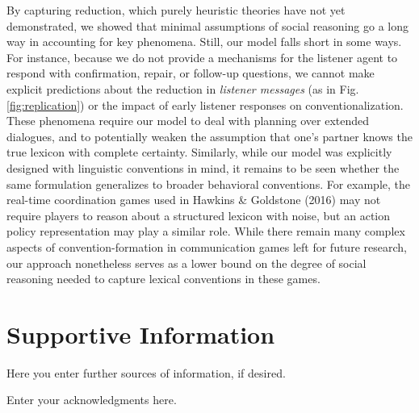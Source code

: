 \documentclass[manuscript]{stjour}
\begin{document}
By capturing reduction, which purely heuristic theories have not yet
demonstrated, we showed that minimal assumptions of social reasoning go
a long way in accounting for key phenomena. Still, our model falls short
in some ways. For instance, because we do not provide a mechanisms for
the listener agent to respond with confirmation, repair, or follow-up
questions, we cannot make explicit predictions about the reduction in
\emph{listener messages} (as in Fig. \ref{fig:replication}) or the
impact of early listener responses on conventionalization. These
phenomena require our model to deal with planning over extended
dialogues, and to potentially weaken the assumption that one's partner
knows the true lexicon with complete certainty. Similarly, while our
model was explicitly designed with linguistic conventions in mind, it
remains to be seen whether the same formulation generalizes to broader
behavioral conventions. For example, the real-time coordination games
used in Hawkins \& Goldstone (2016) may not require players to reason
about a structured lexicon with noise, but an action policy
representation may play a similar role. While there remain many complex
aspects of convention-formation in communication games left for future
research, our approach nonetheless serves as a lower bound on the degree
of social reasoning needed to capture lexical conventions in these
games.


% 

\section{Supportive Information}
Here you enter further sources of information, if desired.


\acknowledgments
Enter your acknowledgments here.


\end{document}
